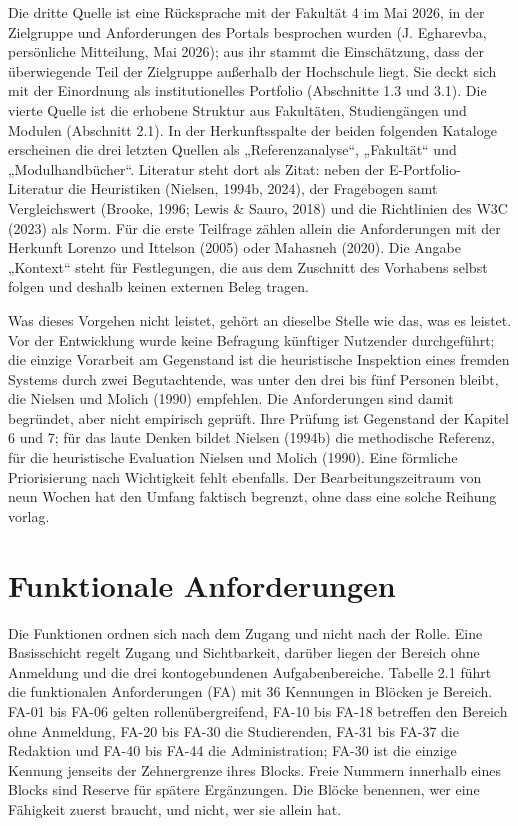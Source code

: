 Die dritte Quelle ist eine Rücksprache mit der Fakultät 4 im Mai 2026, in der Zielgruppe und Anforderungen des Portals besprochen wurden (J. Egharevba, persönliche Mitteilung, Mai 2026); aus ihr stammt die Einschätzung, dass der überwiegende Teil der Zielgruppe außerhalb der Hochschule liegt. Sie deckt sich mit der Einordnung als institutionelles Portfolio (Abschnitte 1.3 und 3.1). Die vierte Quelle ist die erhobene Struktur aus Fakultäten, Studiengängen und Modulen (Abschnitt 2.1). In der Herkunftsspalte der beiden folgenden Kataloge erscheinen die drei letzten Quellen als „Referenzanalyse“, „Fakultät“ und „Modulhandbücher“. Literatur steht dort als Zitat: neben der E-Portfolio-Literatur die Heuristiken (Nielsen, 1994b, 2024), der Fragebogen samt Vergleichswert (Brooke, 1996; Lewis \& Sauro, 2018) und die Richtlinien des W3C (2023) als Norm. Für die erste Teilfrage zählen allein die Anforderungen mit der Herkunft Lorenzo und Ittelson (2005) oder Mahasneh (2020). Die Angabe „Kontext“ steht für Festlegungen, die aus dem Zuschnitt des Vorhabens selbst folgen und deshalb keinen externen Beleg tragen.

Was dieses Vorgehen nicht leistet, gehört an dieselbe Stelle wie das, was es leistet. Vor der Entwicklung wurde keine Befragung künftiger Nutzender durchgeführt; die einzige Vorarbeit am Gegenstand ist die heuristische Inspektion eines fremden Systems durch zwei Begutachtende, was unter den drei bis fünf Personen bleibt, die Nielsen und Molich (1990) empfehlen. Die Anforderungen sind damit begründet, aber nicht empirisch geprüft. Ihre Prüfung ist Gegenstand der Kapitel 6 und 7; für das laute Denken bildet Nielsen (1994b) die methodische Referenz, für die heuristische Evaluation Nielsen und Molich (1990). Eine förmliche Priorisierung nach Wichtigkeit fehlt ebenfalls. Der Bearbeitungszeitraum von neun Wochen hat den Umfang faktisch begrenzt, ohne dass eine solche Reihung vorlag.

\section{Funktionale Anforderungen}
\label{sec:funktionale-anforderungen}

Die Funktionen ordnen sich nach dem Zugang und nicht nach der Rolle. Eine Basisschicht regelt Zugang und Sichtbarkeit, darüber liegen der Bereich ohne Anmeldung und die drei kontogebundenen Aufgabenbereiche. Tabelle 2.1 führt die funktionalen Anforderungen (FA) mit 36 Kennungen in Blöcken je Bereich. FA-01 bis FA-06 gelten rollenübergreifend, FA-10 bis FA-18 betreffen den Bereich ohne Anmeldung, FA-20 bis FA-30 die Studierenden, FA-31 bis FA-37 die Redaktion und FA-40 bis FA-44 die Administration; FA-30 ist die einzige Kennung jenseits der Zehnergrenze ihres Blocks. Freie Nummern innerhalb eines Blocks sind Reserve für spätere Ergänzungen. Die Blöcke benennen, wer eine Fähigkeit zuerst braucht, und nicht, wer sie allein hat.

